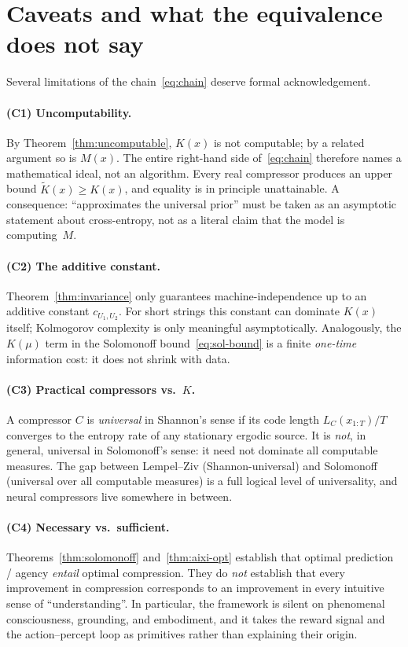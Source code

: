 \section{Caveats and what the equivalence does not say}
\label{sec:caveats}

Several limitations of the chain~\eqref{eq:chain} deserve formal
acknowledgement.

\paragraph{(C1) Uncomputability.}
By Theorem~\ref{thm:uncomputable}, $K(x)$ is not computable; by a
related argument so is $M(x)$. The entire right-hand side
of~\eqref{eq:chain} therefore names a mathematical ideal, not an
algorithm. Every real compressor produces an upper bound
$\tilde K(x) \ge K(x)$, and equality is in principle unattainable.
A consequence: ``approximates the universal prior'' must be taken as
an asymptotic statement about cross-entropy, not as a literal claim
that the model is computing~$M$.

\paragraph{(C2) The additive constant.}
Theorem~\ref{thm:invariance} only guarantees machine-independence up to
an additive constant $c_{U_1, U_2}$. For short strings this constant
can dominate $K(x)$ itself; Kolmogorov complexity is only meaningful
asymptotically. Analogously, the $K(\mu)$ term in the Solomonoff
bound~\eqref{eq:sol-bound} is a finite \emph{one-time} information
cost: it does not shrink with data.

\paragraph{(C3) Practical compressors vs.\ $K$.}
A compressor $C$ is \emph{universal} in Shannon's sense if its code
length $L_C(x_{1:T})/T$ converges to the entropy rate of any
stationary ergodic source. It is \emph{not}, in general, universal in
Solomonoff's sense: it need not dominate all computable measures. The
gap between Lempel--Ziv (Shannon-universal) and Solomonoff
(universal over all computable measures) is a full logical level of
universality, and neural compressors live somewhere in between.

\paragraph{(C4) Necessary vs.\ sufficient.}
Theorems~\ref{thm:solomonoff} and~\ref{thm:aixi-opt} establish that
optimal prediction / agency \emph{entail} optimal compression. They do
\emph{not} establish that every improvement in compression
corresponds to an improvement in every intuitive sense of
``understanding''. In particular, the framework is silent on
phenomenal consciousness, grounding, and embodiment, and it takes the
reward signal and the action--percept loop as primitives rather than
explaining their origin.


